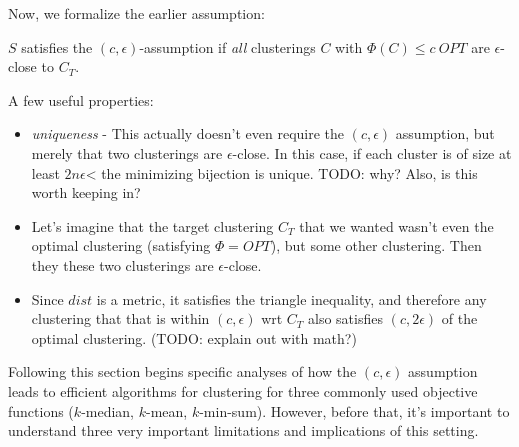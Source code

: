 \documentclass[paper=a4, fontsize=11pt]{scrartcl} %
\numberwithin{equation}{section} %
\numberwithin{figure}{section} %
\numberwithin{table}{section} %
\begin{document}
Now, we formalize the earlier assumption:

$S$ satisfies the $(c, \epsilon)$-assumption if \emph{all} clusterings $C$ with $\Phi(C) \leq c~OPT$ are $\epsilon$-close to $C_T$.

A few useful properties:

\begin{itemize}

\item \emph{uniqueness} - This actually doesn't even require the $(c, \epsilon)$ assumption, but merely that two clusterings are $\epsilon$-close.  In this case, if each cluster is of size at least $2n\epsilon$< the minimizing bijection is unique. TODO: why?  Also, is this worth keeping in?

\item Let's imagine that the target clustering $C_T$ that we wanted wasn't even the optimal clustering (satisfying $\Phi = OPT$), but some other clustering.  Then they these two clusterings are $\epsilon$-close.

\item Since $dist$ is a metric, it satisfies the triangle inequality, and therefore any clustering that that is within $(c, \epsilon)$ wrt $C_T$ also satisfies $(c, 2\epsilon)$ of the optimal clustering. (TODO: explain out with math?)



\end{itemize}

Following this section begins specific analyses of how the $(c, \epsilon)$ assumption leads to efficient algorithms for clustering for three commonly used objective functions ($k$-median, $k$-mean, $k$-min-sum).  However, before that, it's important to understand three very important limitations and implications of this setting.
\end{document}
